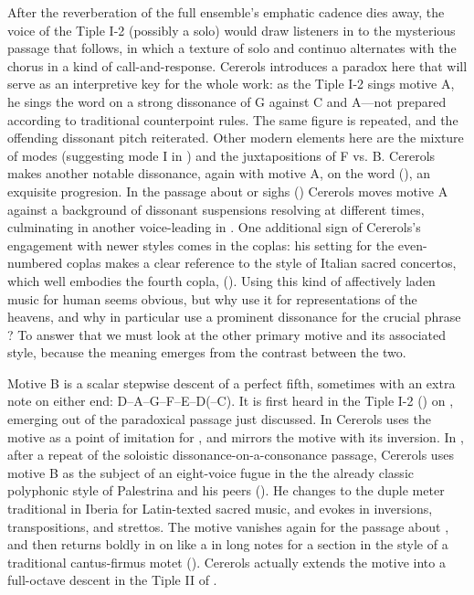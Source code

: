 After the reverberation of the full ensemble's emphatic cadence dies away, the
voice of the Tiple I-2 (possibly a solo) would draw listeners in to the
mysterious passage that follows, in which a texture of solo and continuo
alternates with the chorus in a kind of call-and-response.
Cererols introduces a paradox here that will serve as an interpretive key for
the whole work: as the Tiple I-2 sings motive A, he sings the word
 on a strong dissonance of G against C\sh{} and A---not
prepared according to traditional counterpoint rules.
The same figure is repeated, and the offending dissonant pitch reiterated.
Other modern elements here are the mixture of modes (suggesting mode I in
) and the juxtapositions of F\sh{} vs. B\fl{}.
Cererols makes another notable dissonance, again with motive A, on the word
 (), an exquisite
 progresion.
In the passage about  or sighs () Cererols
moves motive A against a background of dissonant suspensions resolving at
different times, culminating in another voice-leading  in
.
One additional sign of Cererols's engagement with newer styles comes in the
coplas: his setting for the even-numbered coplas makes a clear reference to the
style of Italian sacred concertos, which well embodies the fourth copla,
 ().
Using this kind of affectively laden music for human  seems
obvious, but why use it for representations of the heavens, and why in
particular use a prominent dissonance for the crucial phrase ?
To answer that we must look at the other primary motive and its associated
style, because the meaning emerges from the contrast between the two.

Motive B is a scalar stepwise descent of a perfect fifth, sometimes with an
extra note on either end: D--A--G--F--E--D(--C\sh). 
It is first heard in the Tiple I-2 () on ,
emerging out of the paradoxical passage just discussed.
In  Cererols uses the motive as a point of imitation for
, and mirrors the motive with its
inversion.
In , after a repeat of the soloistic dissonance-on-a-consonance
passage, Cererols uses motive B as the subject of an eight-voice fugue in the
the already classic polyphonic style of Palestrina and his peers
().
He changes to the duple meter traditional in Iberia for Latin-texted sacred
music, and evokes  in inversions, transpositions,
and strettos.  
The motive vanishes again for the passage about , and then
returns boldly in  on  like a
  in long notes for a section in the
style of a traditional cantus-firmus motet
().
Cererols actually extends the motive into a full-octave descent in the Tiple II
of .

